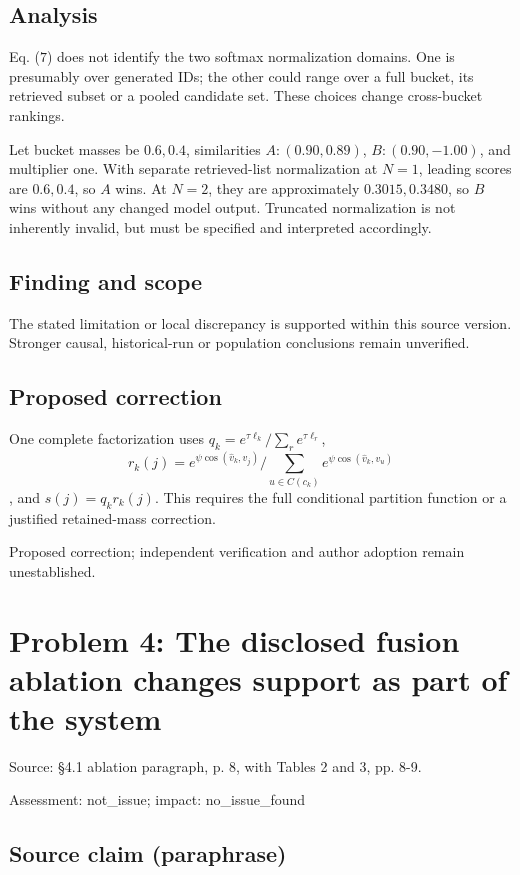 \documentclass[11pt]{article}
\begin{document}
\subsection*{Analysis}

Eq. (\(7\)) does not identify the two softmax normalization domains. One is presumably over generated IDs; the other could range over a full bucket, its retrieved subset or a pooled candidate set. These choices change cross-bucket rankings.

Let bucket masses be \(0.6,0.4\), similarities \(A:(0.90,0.89)\), \(B:(0.90,-1.00)\), and multiplier one. With separate retrieved-list normalization at \(N=1\), leading scores are \(0.6,0.4\), so \(A\) wins. At \(N=2\), they are approximately \(0.3015,0.3480\), so \(B\) wins without any changed model output. Truncated normalization is not inherently invalid, but must be specified and interpreted accordingly.

\subsection*{Finding and scope}

The stated limitation or local discrepancy is supported within this source version. Stronger causal, historical-run or population conclusions remain unverified.

\subsection*{Proposed correction}

One complete factorization uses \(q_k=e^{\tau\ell_k}/\sum_re^{\tau\ell_r}\), \[r_k(j)=e^{\psi\cos(\widehat v_k,v_j)}/\sum_{u\in C(c_k)}e^{\psi\cos(\widehat v_k,v_u)}\], and \(s(j)=q_kr_k(j)\). This requires the full conditional partition function or a justified retained-mass correction.

Proposed correction; independent verification and author adoption remain unestablished.

\section*{Problem 4: The disclosed fusion ablation changes support as part of the system}

Source: §4.1 ablation paragraph, p. 8, with Tables 2 and 3, pp. 8-9.

Assessment: not\_issue; impact: no\_issue\_found

\subsection*{Source claim (paraphrase)}
\end{document}
